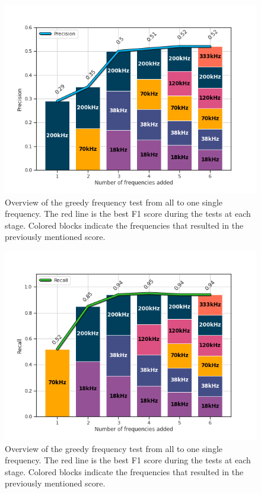     
    \clearpage
    \begin{figure}[H]
        \centering
        \includegraphics[scale=0.7]{figures/increasing_freq_precision.png}
        \caption{Overview of the greedy frequency test from all to one single frequency. The red line is the best F1 score during the tests at each stage. Colored blocks indicate the frequencies that resulted in the previously mentioned score.}
      	\medskip 
        \label{increasing_freq_precision_score_fig}
    \end{figure}

    \clearpage
    \begin{figure}[H]
        \centering
        \includegraphics[scale=0.7]{figures/increasing_freq_recall.png}
        \caption{Overview of the greedy frequency test from all to one single frequency. The red line is the best F1 score during the tests at each stage. Colored blocks indicate the frequencies that resulted in the previously mentioned score.}
      	\medskip 
        \label{increasing_freq_recall_score_fig}
    \end{figure}
    
